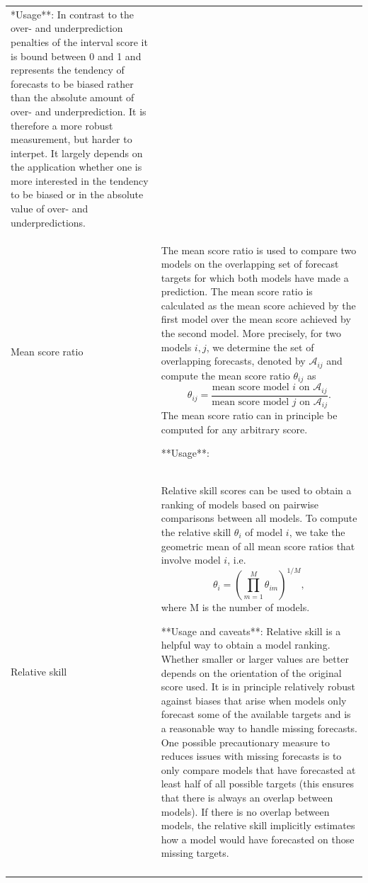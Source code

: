 \documentclass[
]{jss}
\begin{document}
\begin{CodeChunk}
\begin{longtable}[t]{>{\raggedright\arraybackslash}p{1.1in}>{\raggedright\arraybackslash}p{4.625in}}
  **Usage**:
  In contrast to the over- and underprediction penalties of the interval score it is bound between 0 and 1 and represents the tendency of forecasts to be biased rather than the absolute amount of over- and underprediction. It is therefore a more robust measurement, but harder to interpet. It largely depends on the application whether one is more interested in the tendency to be biased or in the absolute value of over- and underpredictions.\\
\addlinespace
Mean score ratio & The mean score ratio is used to compare two models on the overlapping set of forecast targets for which both models have made a prediction. The mean score ratio is calculated as the mean score achieved by the first model over the mean score achieved by the second model. More precisely, for two models $i, j$, we determine the set of overlapping forecasts, denoted by $\mathcal{A}_{ij}$ and compute the mean score ratio $\theta_{ij}$ as
  $$\theta_{ij} =\frac{\text{mean score model } i \text{ on } \mathcal{A}_{ij}}{\text{mean score model } j \text{ on } \mathcal{A}_{ij}}.$$
  The mean score ratio can in principle be computed for any arbitrary score.

  **Usage**:
\cellcolor{gray!6}{  Mean scores ratios are usually calculated in the context of pairwise comparisons, where a set of models is compared by looking at mean score ratios of all possible parings. Whether smaller or larger values are better depends on the orientation of the original score used}\\
\addlinespace
Relative skill & Relative skill scores can be used to obtain a ranking of models based on pairwise comparisons between all models. To compute the relative skill $\theta_i$ of model $i$, we take the geometric mean of all mean score ratios that involve model $i$, i.e.
  $$ \theta_{i} = \left(\prod_{m = 1}^M \theta_{im}\right)^{1/M}, $$
  where M is the number of models.

  **Usage and caveats**:
  Relative skill is a helpful way to obtain a model ranking. Whether smaller or larger values are better depends on the orientation of the original score used.
  It is in principle relatively robust against biases that arise when models only forecast some of the available targets and is a reasonable way to handle missing forecasts. One possible precautionary measure to reduces issues with missing forecasts is to only compare models that have forecasted at least half of all possible targets (this ensures that there is always an overlap between models). If there is no overlap between models, the relative skill implicitly estimates how a model would have forecasted on those missing targets.\\*
\end{longtable}

\end{CodeChunk}

\newpage


\end{document}
